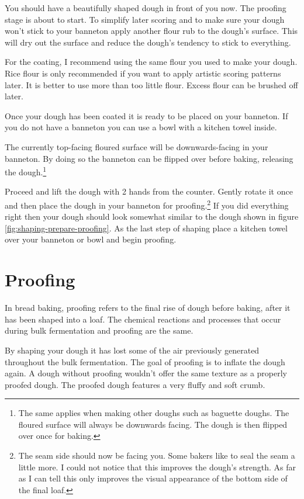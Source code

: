 You should have a beautifully shaped dough in front of you now.
The proofing stage is about to start. To simplify later
scoring and to make sure your dough won't stick to your banneton
apply another flour rub to the dough's surface. This
will dry out the surface and reduce the dough's tendency
to stick to everything.

For the coating, I recommend using the same flour you used
to make your dough. Rice flour is only recommended if you
want to apply artistic scoring patterns later. It is better
to use more than too little flour. Excess flour can be
brushed off later.

Once your dough has been coated it is ready to be placed on your banneton.
If you do not have a banneton you can use a bowl
with a kitchen towel inside.

The currently top-facing floured surface will be downwards-facing in your banneton.
By doing so the banneton can be flipped
over before baking, releasing the dough.\footnote{The same
applies when making other doughs such as baguette doughs. The floured
surface will always be downwards facing. The dough is then flipped over
once for baking.}

Proceed and lift the dough with 2 hands from the counter.
Gently rotate it once and then place the dough in your
banneton for proofing.\footnote{The seam side should now be facing you.
Some bakers like to seal the seam a little more. I could
not notice that this improves the dough's strength. As far as I can
tell this only improves the visual appearance of the bottom side
of the final loaf.} If you did everything right then your
dough should look somewhat similar to the dough shown in figure \ref{fig:shaping-prepare-proofing}.
As the last step of shaping place a kitchen towel over your banneton
or bowl and begin proofing.

\section{Proofing}

In bread baking, proofing refers to the final rise of dough before baking,
after it has been shaped into a loaf. The chemical reactions and processes
that occur during bulk fermentation and proofing are the same.

By shaping your dough it has lost some of the air previously generated
throughout the bulk fermentation. The goal of proofing is to inflate
the dough again. A dough without proofing wouldn't offer the same texture
as a properly proofed dough. The proofed dough features a very fluffy
and soft crumb.

